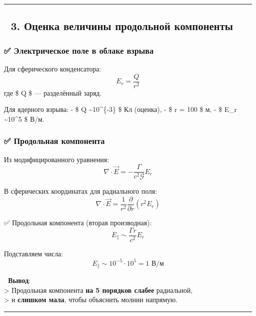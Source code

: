 \documentclass[11pt]{article}
\begin{document}
\begin{center}\rule{0.5\linewidth}{\linethickness}\end{center}

\subsection{🔹 3. Оценка величины продольной
компоненты}\label{ux43eux446ux435ux43dux43aux430-ux432ux435ux43bux438ux447ux438ux43dux44b-ux43fux440ux43eux434ux43eux43bux44cux43dux43eux439-ux43aux43eux43cux43fux43eux43dux435ux43dux442ux44b}

\subsubsection{✅ Электрическое поле в облаке
взрыва}\label{ux44dux43bux435ux43aux442ux440ux438ux447ux435ux441ux43aux43eux435-ux43fux43eux43bux435-ux432-ux43eux431ux43bux430ux43aux435-ux432ux437ux440ux44bux432ux430}

Для сферического конденсатора: \[
E_r = \frac{Q}{r^2}
\] где \$ Q \$ --- разделённый заряд.

Для ядерного взрыва: - \$ Q \sim 10\^{}\{-3\} \$ Кл (оценка), - \$ r =
100 \$ м, - \$ E\_r \sim 10\^{}5 \$ В/м.

\subsubsection{✅ Продольная
компонента}\label{ux43fux440ux43eux434ux43eux43bux44cux43dux430ux44f-ux43aux43eux43cux43fux43eux43dux435ux43dux442ux430}

Из модифицированного уравнения: \[
\nabla \cdot \vec{E} = -\frac{\Gamma}{c^2 \mathcal{G}} E_r
\]

В сферических координатах для радиального поля: \[
\nabla \cdot \vec{E} = \frac{1}{r^2} \frac{\partial}{\partial r} (r^2 E_r)
\]

✅ Продольная компонента (вторая производная): \[
E_{\parallel} \sim \frac{\Gamma r}{c^2} E_r
\]

Подставляем числа: \[
E_{\parallel} \sim 10^{-5} \cdot 10^5 = 1 \text{ В/м}
\]

📌 \textbf{Вывод}:\\
\textgreater{} Продольная компонента \textbf{на 5 порядков слабее}
радиальной,\\
\textgreater{} и \textbf{слишком мала}, чтобы объяснить молнии напрямую.

\begin{center}\rule{0.5\linewidth}{\linethickness}\end{center}
\end{document}
